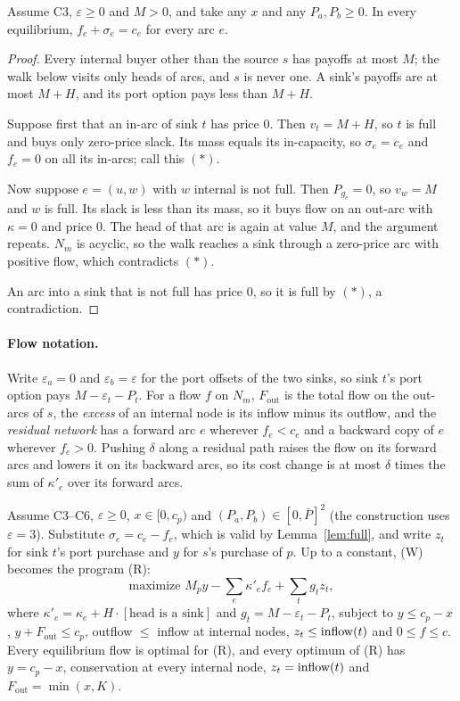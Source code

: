\begin{lemma}\label{lem:full}
Assume C3, $\varepsilon\ge0$ and $M>0$, and take any $x$ and any $P_a,P_b\ge0$. In every equilibrium, $f_e+\sigma_e=c_e$ for every
arc $e$.
\end{lemma}

\begin{proof}
Every internal buyer other than the source $s$ has payoffs at most $M$; the walk below visits only heads of arcs, and $s$ is never one. A sink's payoffs are at most $M+H$, and its port option pays
less than $M+H$.

Suppose first that an in-arc of sink $t$ has price $0$. Then $v_t=M+H$, so $t$ is full and buys only
zero-price slack. Its mass equals its in-capacity, so $\sigma_e=c_e$ and $f_e=0$ on all its in-arcs; call
this $(\ast)$.

Now suppose $e=(u,w)$ with $w$ internal is not full. Then $P_{g_e}=0$, so $v_w=M$ and $w$ is full. Its
slack is less than its mass, so it buys flow on an out-arc with $\kappa=0$ and price $0$. The head of that
arc is again at value $M$, and the argument repeats. $N_m$ is acyclic, so the walk reaches a sink
through a zero-price arc with positive flow, which contradicts $(\ast)$.

An arc into a sink that is not full has price $0$, so it is full by $(\ast)$, a contradiction.
\end{proof}

\paragraph{Flow notation.} Write $\varepsilon_a=0$ and $\varepsilon_b=\varepsilon$ for the port offsets of the two
sinks, so sink $t$'s port option pays $M-\varepsilon_t-P_t$. For a flow $f$ on $N_m$, $F_{\mathrm{out}}$ is
the total flow on the out-arcs of $s$, the \emph{excess} of an internal node is its inflow minus its
outflow, and the \emph{residual network} has a forward arc $e$ wherever $f_e<c_e$ and a backward copy of
$e$ wherever $f_e>0$. Pushing $\delta$ along a residual path raises the flow on its forward arcs and lowers
it on its backward arcs, so its cost change is at most $\delta$ times the sum of $\kappa'_e$ over its
forward arcs.

\begin{lemma}\label{lem:flow}
Assume C3--C6, $\varepsilon\ge0$, $x\in[0,c_p)$ and $(P_a,P_b)\in[0,\bar P]^2$ (the construction uses $\varepsilon=3$). Substitute $\sigma_e=c_e-f_e$, which is
valid by Lemma~\ref{lem:full}, and write $z_t$ for sink $t$'s port purchase and $y$ for $s$'s purchase
of $p$. Up to a constant, (W) becomes the program (R):
\[
\text{maximize } M_py-\sum_e\kappa'_ef_e+\sum_tg_tz_t,
\]
where $\kappa'_e=\kappa_e+H\cdot[\text{head is a sink}]$ and $g_t=M-\varepsilon_t-P_t$, subject to
$y\le c_p-x$, $y+F_{\mathrm{out}}\le c_p$, outflow $\le$ inflow at internal nodes, $z_t\le\mathrm{inflow}(t)$
and $0\le f\le c$. Every equilibrium flow is optimal for (R), and every optimum of (R) has $y=c_p-x$,
conservation at every internal node, $z_t=\mathrm{inflow}(t)$ and $F_{\mathrm{out}}=\min(x,K)$.
\end{lemma}

